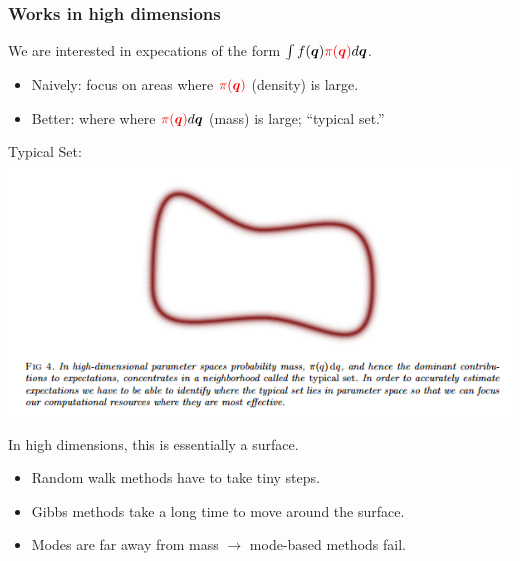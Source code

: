\documentclass[xcolor=dvipsnames]{beamer}
\begin{document}
\begin{frame}
\frametitle{Works in high dimensions}
We are interested in expecations of the form $\int f(\bm{q}){\color{red}\pi(\bm{q})}d\bm{q}$.
\begin{itemize}
\item Naively: focus on areas where ${\color{red}\pi(\bm{q})}$ (density) is large.
\item Better: where where ${\color{red}\pi(\bm{q})}d\bm{q}$ (mass) is large; ``typical set.''
\end{itemize}
\begin{center}
Typical Set:\\
\includegraphics[height=0.4\textheight]{typicalset.png}
\end{center}
In high dimensions, this is essentially a surface.
\begin{itemize}
\item Random walk methods have to take tiny steps.
\item Gibbs methods take a long time to move around the surface.
\item Modes are far away from mass $\to$ mode-based methods fail.
\end{itemize}
\end{frame}
\end{document}
